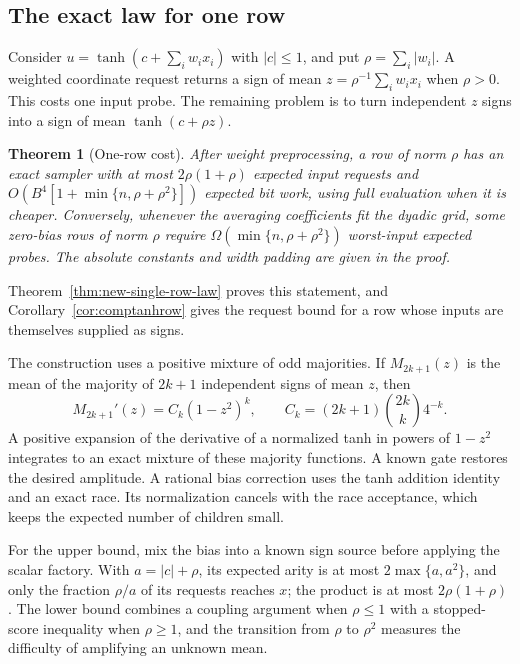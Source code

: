 \documentclass[11pt]{article}
\newtheorem{theorem}{Theorem}[section]
\theoremstyle{definition}
\theoremstyle{remark}
\numberwithin{equation}{section}
\begin{document}
\subsection{The exact law for one row}

Consider $u=\tanh(c+\sum_iw_ix_i)$ with $|c|\le1$, and put
$\rho=\sum_i|w_i|$. A weighted coordinate request returns a sign of mean
$z=\rho^{-1}\sum_iw_ix_i$ when $\rho>0$. This costs one input probe.
The remaining problem is to turn independent $z$ signs into a sign
of mean $\tanh(c+\rho z)$.

\begin{theorem}[One-row cost]
\label{thm:main-row}
After weight preprocessing, a row of norm $\rho$ has an exact sampler
with at most $2\rho(1+\rho)$ expected input requests and
$O(B^4[1+\min\{n,\rho+\rho^2\}])$ expected bit work, using full evaluation
when it is cheaper. Conversely, whenever the averaging coefficients
fit the dyadic grid, some zero-bias rows of norm $\rho$ require
$\Omega(\min\{n,\rho+\rho^2\})$ worst-input expected probes.
The absolute constants and width padding are given in the proof.
\end{theorem}

Theorem~\ref{thm:new-single-row-law} proves this statement, and
Corollary~\ref{cor:comptanhrow} gives the request bound for a row
whose inputs are themselves supplied as signs.

The construction uses a positive mixture of odd majorities.
If $M_{2k+1}(z)$ is the mean of the majority of $2k+1$ independent
signs of mean $z$, then
\begin{equation}
 M_{2k+1}'(z)=C_k(1-z^2)^k,\qquad
 C_k=(2k+1)\binom{2k}{k}4^{-k}.
 \label{eq:main-majority}
\end{equation}
A positive expansion of the derivative of a normalized tanh in
powers of $1-z^2$ integrates to an exact mixture of these majority
functions. A known gate restores the desired amplitude.
A rational bias correction uses the tanh addition identity and
an exact race. Its normalization cancels with the race acceptance,
which keeps the expected number of children small.

For the upper bound, mix the bias into a known sign source before
applying the scalar factory. With $a=|c|+\rho$, its expected arity is
at most $2\max\{a,a^2\}$, and only the fraction $\rho/a$ of its
requests reaches $x$; the product is at most $2\rho(1+\rho)$. The lower bound
combines a coupling argument when $\rho\le1$ with a stopped-score
inequality when $\rho\ge1$, and the transition from $\rho$ to $\rho^2$
measures the difficulty of amplifying an unknown mean.
\end{document}
